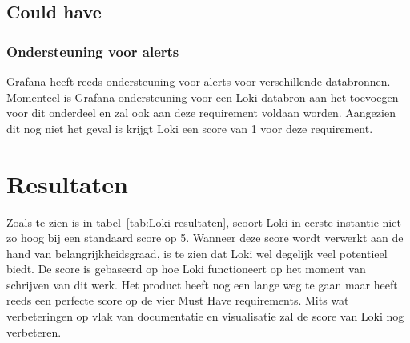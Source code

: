 \subsection{Could have}
\subsubsection{Ondersteuning voor alerts}
Grafana heeft reeds ondersteuning voor alerts voor verschillende databronnen. Momenteel is Grafana ondersteuning voor een Loki databron aan het toevoegen voor dit onderdeel en zal ook aan deze requirement voldaan worden. Aangezien dit nog niet het geval is krijgt Loki een score van 1 voor deze requirement.

\section{Resultaten}
Zoals te zien is in tabel~\ref{tab:Loki-resultaten}, scoort Loki in eerste instantie niet zo hoog bij een standaard score op 5. Wanneer deze score wordt verwerkt aan de hand van belangrijkheidsgraad, is te zien dat Loki wel degelijk veel potentieel biedt. De score is gebaseerd op hoe Loki functioneert op het moment van schrijven van dit werk. Het product heeft nog een lange weg te gaan maar heeft reeds een perfecte score op de vier Must Have requirements. Mits wat verbeteringen op vlak van documentatie en visualisatie zal de score van Loki nog verbeteren.

